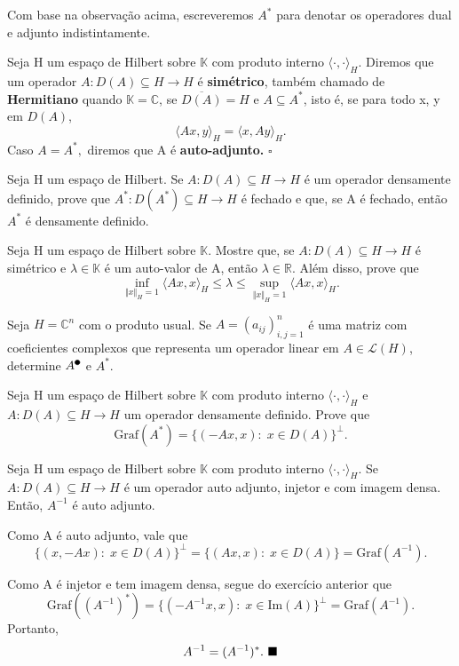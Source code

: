 \documentclass[../functional_analysis.tex]{subfiles}
\begin{document}
Com base na observação acima, escreveremos \(A^{*}\) para denotar os operadores dual e adjunto indistintamente.

\begin{def*}
	Seja H um espaço de Hilbert sobre \(\mathbb{K}\) com produto interno \(\langle \cdot , \cdot  \rangle_{H}\). Diremos que um operador
	\(A:D(A)\subseteq H\rightarrow H\) é \textbf{simétrico}, também chamado de \textbf{Hermitiano} quando \(\mathbb{K} = \mathbb{C}\), se
	\(\overline{D(A)} = H\) e \(A\subseteq A^{*}\), isto é, se para todo x, y em \(D(A)\),
	\[
		\langle Ax, y \rangle_{H} = \langle x, Ay \rangle_{H}.
	\]
	Caso \(A = A^{*},\) diremos que A é \textbf{auto-adjunto.} \(\square\)
\end{def*}
\begin{exr}
	Seja H um espaço de Hilbert. Se \(A:D(A)\subseteq H\rightarrow H\) é um operador densamente definido, prove que \(A^{*}:D(A^{*})\subseteq H\rightarrow H\) é fechado e que, se A é fechado, então \(A^{*}\) é
	densamente definido.
\end{exr}
\begin{exr}
	Seja H um espaço de Hilbert sobre \(\mathbb{K}\). Mostre que, se \(A:D(A)\subseteq H\rightarrow H\) é simétrico e \(\lambda \in \mathbb{K}\) é um auto-valor de A, então \(\lambda \in \mathbb{R}\). Além disso, prove que
	\[
		\inf_{\Vert x \Vert_{H} = 1} \langle Ax, x \rangle_{H} \leq \lambda \leq \sup_{\Vert x \Vert_{H} = 1}\langle Ax, x \rangle_{H}.
	\]
\end{exr}
\begin{exr}
	Seja \(H = \mathbb{C}^{n}\) com o produto usual. Se \(A = (a_{ij})_{i, j=1}^{n}\) é uma matriz com coeficientes complexos que representa um operador linear em \(A\in \mathcal{L}(H)\),
	determine \(A^{\tikz[baseline=-0.5ex]\draw[black, fill=black, radius=2pt](0, 0)circle;}\) e \(A^{*}.\)
\end{exr}
\begin{exr}
	Seja H um espaço de Hilbert sobre \(\mathbb{K}\) com produto interno \(\langle \cdot , \cdot  \rangle_{H}\) e
	\(A:D(A)\subseteq H\rightarrow H\) um operador densamente definido. Prove que
	\[
		\mathrm{Graf}(A^{*}) = \{(-Ax, x):\; x\in D(A)\}^{\perp }.
	\]
\end{exr}
\begin{prop*}
	Seja H um espaço de Hilbert sobre \(\mathbb{K}\) com produto interno \(\langle \cdot , \cdot  \rangle_{H}\). Se
	\(A:D(A)\subseteq H\rightarrow H\) é um operador auto adjunto, injetor e com imagem densa. Então, \(A^{-1}\) é
	auto adjunto.
\end{prop*}
\begin{proof*}
	Como A é auto adjunto, vale que
	\[
		\{(x, -Ax):\; x\in D(A)\}^{\perp } = \{(Ax, x):\; x\in D(A)\} = \mathrm{Graf}(A^{-1}).
	\]

	Como A é injetor e tem imagem densa, segue do exercício anterior que
	\[
		\mathrm{Graf}((A^{-1})^{*}) = \{(-A^{-1}x, x):\; x\in \mathrm{Im}(A)\}^{\perp } = \mathrm{Graf}(A^{-1}).
	\]
	Portanto,
	\[
		A^{-1} = (A^{-1})^{*}. \text{ $\blacksquare$}
	\]
\end{proof*}
\end{document}

